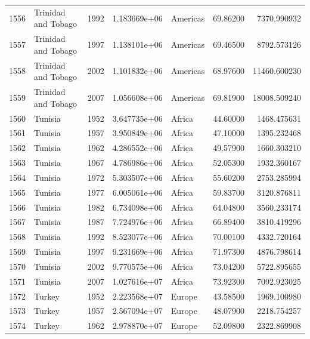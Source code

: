 \documentclass[
  letterpaper,
  DIV=11,
  numbers=noendperiod]{scrreprt}
\begin{document}
\begin{tabular}{llrrlrr}
1556 &       Trinidad and Tobago &  1992 &  1.183669e+06 &  Americas &  69.86200 &    7370.990932 \\
1557 &       Trinidad and Tobago &  1997 &  1.138101e+06 &  Americas &  69.46500 &    8792.573126 \\
1558 &       Trinidad and Tobago &  2002 &  1.101832e+06 &  Americas &  68.97600 &   11460.600230 \\
1559 &       Trinidad and Tobago &  2007 &  1.056608e+06 &  Americas &  69.81900 &   18008.509240 \\
1560 &                   Tunisia &  1952 &  3.647735e+06 &    Africa &  44.60000 &    1468.475631 \\
1561 &                   Tunisia &  1957 &  3.950849e+06 &    Africa &  47.10000 &    1395.232468 \\
1562 &                   Tunisia &  1962 &  4.286552e+06 &    Africa &  49.57900 &    1660.303210 \\
1563 &                   Tunisia &  1967 &  4.786986e+06 &    Africa &  52.05300 &    1932.360167 \\
1564 &                   Tunisia &  1972 &  5.303507e+06 &    Africa &  55.60200 &    2753.285994 \\
1565 &                   Tunisia &  1977 &  6.005061e+06 &    Africa &  59.83700 &    3120.876811 \\
1566 &                   Tunisia &  1982 &  6.734098e+06 &    Africa &  64.04800 &    3560.233174 \\
1567 &                   Tunisia &  1987 &  7.724976e+06 &    Africa &  66.89400 &    3810.419296 \\
1568 &                   Tunisia &  1992 &  8.523077e+06 &    Africa &  70.00100 &    4332.720164 \\
1569 &                   Tunisia &  1997 &  9.231669e+06 &    Africa &  71.97300 &    4876.798614 \\
1570 &                   Tunisia &  2002 &  9.770575e+06 &    Africa &  73.04200 &    5722.895655 \\
1571 &                   Tunisia &  2007 &  1.027616e+07 &    Africa &  73.92300 &    7092.923025 \\
1572 &                    Turkey &  1952 &  2.223568e+07 &    Europe &  43.58500 &    1969.100980 \\
1573 &                    Turkey &  1957 &  2.567094e+07 &    Europe &  48.07900 &    2218.754257 \\
1574 &                    Turkey &  1962 &  2.978870e+07 &    Europe &  52.09800 &    2322.869908 \\

\end{tabular}
\end{document}
